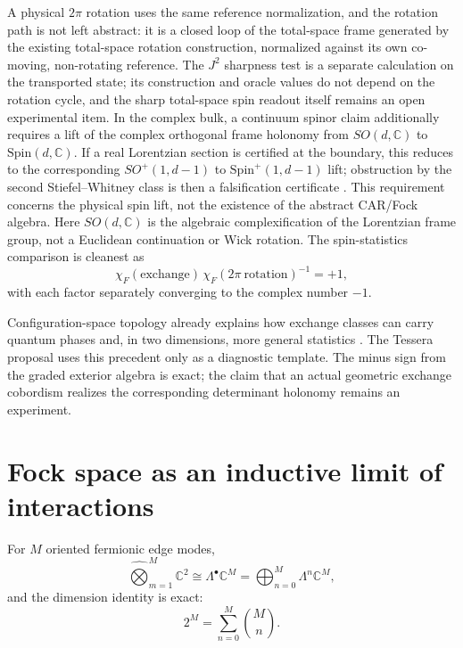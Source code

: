 \documentclass[11pt,letterpaper]{article}
\begin{document}
A physical $2\pi$ rotation uses the same reference normalization, and the
rotation path is not left abstract: it is a closed loop of the total-space
frame generated by the existing total-space rotation construction, normalized
against its own co-moving, non-rotating reference. The $J^{2}$ sharpness test
is a separate calculation on the transported state; its construction and
oracle values do not depend on the rotation cycle, and the sharp total-space
spin readout itself remains an open experimental item. In the complex bulk, a
continuum spinor claim additionally requires a lift of the complex orthogonal
frame holonomy from $SO(d,\mathbb C)$ to $\mathrm{Spin}(d,\mathbb C)$. If a
real Lorentzian section is certified at the boundary, this reduces to the
corresponding $SO^{+}(1,d-1)$ to $\mathrm{Spin}^{+}(1,d-1)$ lift; obstruction
by the second Stiefel--Whitney class is then a falsification certificate
\cite{lawsonmichelsohn1989}. This requirement concerns the physical spin lift,
not the existence of the abstract CAR/Fock algebra. Here $SO(d,\mathbb C)$ is
the algebraic complexification of the Lorentzian frame group, not a Euclidean
continuation or Wick rotation. The spin-statistics comparison is cleanest as
\begin{equation*}
  \chi_F(\text{exchange})\,
  \chi_F(2\pi\ \text{rotation})^{-1}=+1,
\end{equation*}
with each factor separately converging to the complex number $-1$.

Configuration-space topology already explains how exchange classes can carry
quantum phases \cite{laidlawdewitt1971} and, in two dimensions, more general
statistics \cite{leinaasmyrheim1977}. The Tessera proposal uses this precedent
only as a diagnostic template. The minus sign from the graded exterior algebra
is exact; the claim that an actual geometric exchange cobordism realizes the
corresponding determinant holonomy remains an experiment.

\section{Fock space as an inductive limit of interactions}\label{sec:fock}

For $M$ oriented fermionic edge modes,
\begin{equation*}
  \widehat{\bigotimes}_{m=1}^{M}\mathbb{C}^{2}
  \cong\Lambda^{\bullet}\mathbb{C}^{M}
  =\bigoplus_{n=0}^{M}\Lambda^{n}\mathbb{C}^{M},
\end{equation*}
and the dimension identity is exact:
\begin{equation*}
  2^{M}=\sum_{n=0}^{M}\binom{M}{n}.
\end{equation*}
\end{document}
